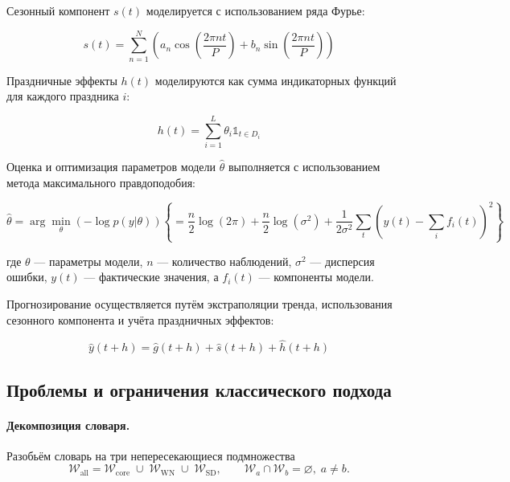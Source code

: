 \documentclass[14pt,a4paper]{article}
\begin{document}
Сезонный компонент $s(t)$ моделируется с использованием ряда Фурье:


\begin{equation}
s(t) = \sum_{n=1}^N \left(a_n \cos\left(\frac{2\pi n t}{P}\right) + b_n \sin\left(\frac{2\pi n t}{P}\right)\right)
\end{equation}

Праздничные эффекты $h(t)$ моделируются как сумма индикаторных функций для каждого праздника $i$:

\begin{equation}
h(t) = \sum_{i=1}^L \theta_i \mathbb{1}_{t \in D_i}
\end{equation}

Оценка и оптимизация параметров модели $\hat{\theta}$ выполняется с использованием метода максимального правдоподобия:

\begin{equation}
\hat{\theta} = \arg\min_{\theta} (-\log p(y | \theta) ) \left\{ = \frac{n}{2}\log(2\pi) + \frac{n}{2}\log(\sigma^2) + \frac{1}{2\sigma^2}\sum_{t} \left(y(t) - \sum_{i} f_i(t)\right)^2 \right\}
\end{equation}

где $\theta$ — параметры модели, $n$ — количество наблюдений, $\sigma^2$ — дисперсия ошибки, $y(t)$ — фактические значения, а $f_i(t)$ — компоненты модели.

Прогнозирование осуществляется путём экстраполяции тренда, использования сезонного компонента и учёта праздничных эффектов:


\begin{equation}
\hat{y}(t+h) = \hat{g}(t+h) + \hat{s}(t+h) + \hat{h}(t+h)
\end{equation}


\newpage
\subsection{Проблемы и ограничения классического подхода}
\label{ssec:limits}

\paragraph{Декомпозиция словаря.}
Разобьём словарь на три непересекающиеся подмножества  
\[
  \mathcal{W}_{\mathrm{all}}
  =\mathcal{W}_{\mathrm{core}}
  \;\cup\;
  \mathcal{W}_{\mathrm{WN}}
  \;\cup\;
  \mathcal{W}_{\mathrm{SD}},
  \qquad
  \mathcal{W}_{a}\cap\mathcal{W}_{b}=\varnothing,\;a\neq b.
\]
\end{document}
